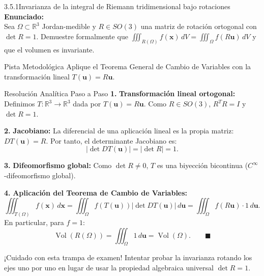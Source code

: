 \documentclass[11pt,a4paper]{article}
\begin{document}
\begin{nivelbox}{3.5.1}{Invarianza de la integral de Riemann tridimensional bajo rotaciones}
\textbf{Enunciado:}\\
Sea $\Omega \subset \mathbb{R}^3$ Jordan-medible y $R \in SO(3)$ una matriz de rotación ortogonal con $\det R = 1$. Demuestre formalmente que $\iiint_{R(\Omega)} f(\mathbf{x}) \, dV = \iiint_\Omega f(R\mathbf{u}) \, dV$ y que el volumen es invariante.

\begin{observacionbox}{Pista Metodológica}
Aplique el Teorema General de Cambio de Variables con la transformación lineal $T(\mathbf{u}) = R\mathbf{u}$.
\end{observacionbox}

\begin{ejerciciobox}{Resolución Analítica Paso a Paso}
\smallskip\noindent\textbf{1.} \textbf{Transformación lineal ortogonal:}
Definimos $T: \mathbb{R}^3 \to \mathbb{R}^3$ dada por $T(\mathbf{u}) = R\mathbf{u}$. Como $R \in SO(3)$, $R^T R = I$ y $\det R = 1$.

\smallskip\noindent\textbf{2.} \textbf{Jacobiano:}
La diferencial de una aplicación lineal es la propia matriz: $DT(\mathbf{u}) = R$. Por tanto, el determinante Jacobiano es:
\[|\det DT(\mathbf{u})| = |\det R| = 1.\]

\smallskip\noindent\textbf{3.} \textbf{Difeomorfismo global:}
Como $\det R \neq 0$, $T$ es una biyección bicontinua ($C^\infty$-difeomorfismo global).

\smallskip\noindent\textbf{4.} \textbf{Aplicación del Teorema de Cambio de Variables:}
\[\iiint_{T(\Omega)} f(\mathbf{x}) \, d\mathbf{x} = \iiint_\Omega f(T(\mathbf{u})) |\det DT(\mathbf{u})| \, d\mathbf{u} = \iiint_\Omega f(R\mathbf{u}) \cdot 1 \, d\mathbf{u}.\]
En particular, para $f = 1$:
\[\operatorname{Vol}(R(\Omega)) = \iiint_\Omega 1 \, d\mathbf{u} = \operatorname{Vol}(\Omega). \qquad \blacksquare\]
\end{ejerciciobox}

\begin{errorbox}{¡Cuidado con esta trampa de examen!}
Intentar probar la invarianza rotando los ejes uno por uno en lugar de usar la propiedad algebraica universal $\det R = 1$.
\end{errorbox}
\end{nivelbox}
\bigskip
\end{document}
